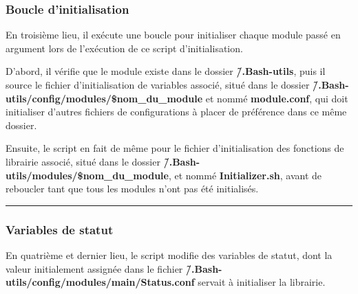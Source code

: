 \documentclass[a4paper,10pt]{article}
\begin{document}
\color{blue}
\subsubsection{Boucle d'initialisation}\color{white}

\begin{justify}
    En troisième lieu, il exécute une boucle pour initialiser chaque module passé en argument lors de l'exécution de ce script d'initialisation.
\end{justify}

\begin{justify}
    D'abord, il vérifie que le module existe dans le dossier \textbf{\color{lime}\~/.Bash-utils}, puis il source le fichier d'initialisation de variables associé, situé dans le dossier \textbf{\color{lime}\~/.Bash-utils/config/modules/\$nom\_du\_module} et nommé \textbf{\color{lime}module.conf}, qui doit initialiser d'autres fichiers de configurations à placer de préférence dans ce même dossier.
\end{justify}

\begin{justify}
    Ensuite, le script en fait de même pour le fichier d'initialisation des fonctions de librairie associé, situé dans le dossier \textbf{\color{lime}\~/.Bash-utils/modules/\$nom\_du\_module}, et nommé \textbf{\color{lime}Initializer.sh}, avant de reboucler tant que tous les modules n'ont pas été initialisés.
\end{justify}



\color{blue}\par\noindent\rule{\textwidth}{0.4pt}\color{white}

\color{blue}
\subsubsection{Variables de statut}\color{white}

\begin{justify}
    En quatrième et dernier lieu, le script modifie des variables de statut, dont la valeur initialement assignée dans le fichier \textbf{\color{lime}\~/.Bash-utils/config/modules/main/Status.conf} servait à initialiser la librairie.
\end{justify}




\end{document}

